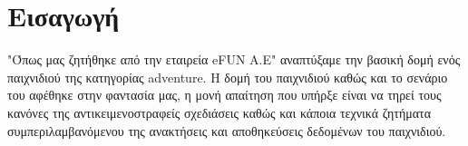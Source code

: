 %
%
\section*{Εισαγωγή}
\noindent
"Όπως μας ζητήθηκε από την εταιρεία eFUN A.E" αναπτύξαμε την βασική δομή
ενός παιχνιδιού της κατηγορίας adventure. Η δομή του παιχνιδιού καθώς και 
το σενάριο του αφέθηκε στην φαντασία μας, η μονή απαίτηση που υπήρξε είναι να τηρεί τους κανόνες της αντικειμενοστραφείς σχεδιάσεις καθώς και κάποια τεχνικά
ζητήματα συμπεριλαμβανόμενου της ανακτήσεις και αποθηκεύσεις δεδομένων του παιχνιδιού. 


